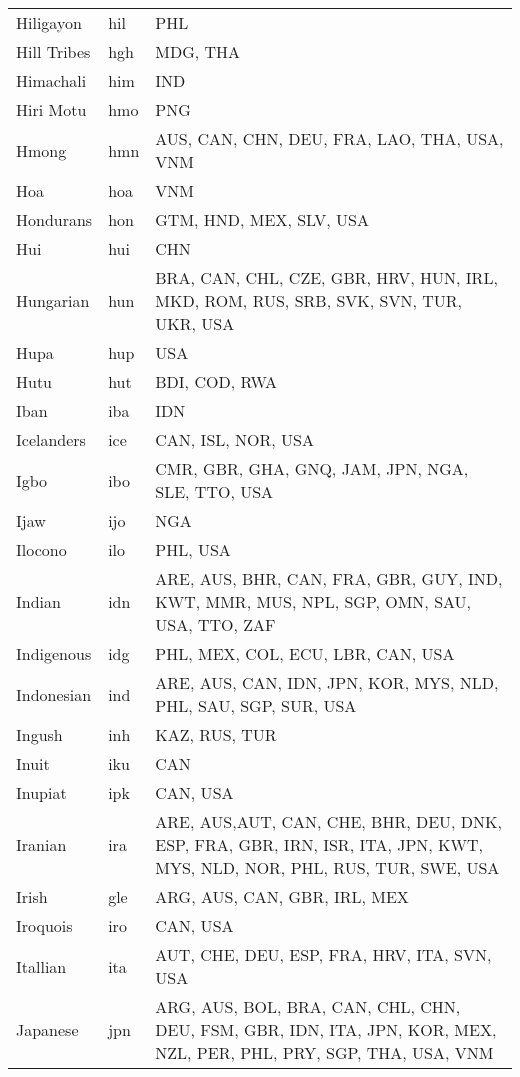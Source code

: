 \documentclass[12pt]{article}
\begin{document}
\begin{center}
\begin{longtable}{|p{7cm}|p{1cm}|p{7cm}|}
Hiligayon	&	hil 	&	PHL	\\	\cline{1-3}
Hill Tribes	&	hgh	&	MDG, THA	\\	\cline{1-3}
Himachali	&	him 	&	IND	\\	\cline{1-3}
Hiri Motu	&	hmo 	&	PNG	\\	\cline{1-3}
Hmong	&	hmn 	&	AUS, CAN, CHN, DEU, FRA, LAO, THA, USA, VNM	\\	\cline{1-3}
Hoa	&	hoa	&	VNM	\\	\cline{1-3}
Hondurans	&	hon	&	GTM, HND, MEX, SLV, USA	\\	\cline{1-3}
Hui	&	hui	&	CHN	\\	\cline{1-3}
Hungarian	&	hun 	&	BRA, CAN, CHL, CZE, GBR, HRV, HUN, IRL, MKD, ROM, RUS, SRB, SVK, SVN, TUR, UKR, USA	\\	 \cline{1-3}
Hupa	&	hup 	&	USA	\\	\cline{1-3}
Hutu	&	hut	&	BDI, COD, RWA	\\	\cline{1-3}
Iban	&	iba 	&	IDN	\\	\cline{1-3}
Icelanders	&	ice	&	CAN, ISL, NOR, USA	\\	\cline{1-3}
Igbo	&	ibo 	&	CMR, GBR, GHA, GNQ, JAM, JPN, NGA, SLE, TTO, USA	\\	\cline{1-3}
Ijaw	&	ijo 	&	NGA	\\	\cline{1-3}
Ilocono	&	ilo 	&	PHL, USA	\\	\cline{1-3}
Indian	&	idn	&	ARE, AUS, BHR, CAN, FRA, GBR, GUY, IND, KWT, MMR, MUS, NPL, SGP, OMN, SAU, USA, TTO, ZAF	\\	 \cline{1-3}
Indigenous	&	idg	&	PHL, MEX, COL, ECU, LBR, CAN, USA	\\	\cline{1-3}
Indonesian	&	ind 	&	ARE, AUS, CAN, IDN, JPN, KOR, MYS, NLD, PHL, SAU, SGP, SUR, USA	\\	\cline{1-3}
Ingush	&	inh 	&	KAZ, RUS, TUR	\\	\cline{1-3}
Inuit	&	iku 	&	CAN	\\	\cline{1-3}
Inupiat	&	ipk 	&	CAN, USA	\\	\cline{1-3}
Iranian	&	ira 	&	ARE, AUS,AUT, CAN, CHE, BHR, DEU, DNK, ESP, FRA, GBR, IRN, ISR, ITA, JPN, KWT, MYS, NLD, NOR, PHL, RUS, TUR, SWE, USA	\\	\cline{1-3}
Irish	&	gle 	&	ARG, AUS, CAN, GBR, IRL, MEX	\\	\cline{1-3}
Iroquois	&	iro 	&	CAN, USA	\\	\cline{1-3}
Itallian	&	ita 	&	AUT, CHE, DEU, ESP, FRA, HRV, ITA, SVN, USA	\\	\cline{1-3}
Japanese	&	jpn 	&	ARG, AUS, BOL, BRA, CAN, CHL, CHN, DEU, FSM, GBR, IDN, ITA, JPN, KOR, MEX, NZL, PER, PHL, PRY, SGP, THA, USA, VNM	\\	\cline{1-3}

\end{longtable}
\end{center}
\end{document}
